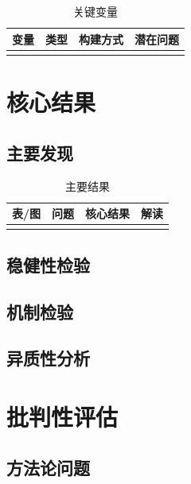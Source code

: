 \documentclass[11pt, a4paper]{article}
\begin{document}
\begin{table}[h]
\centering
\small
\begin{tabularx}{\linewidth}{llXl}
\toprule
变量 & 类型 & 构建方式 & 潜在问题 \\
\midrule
 &  &  &  \\
\bottomrule
\end{tabularx}
\caption{关键变量}
\end{table}

\section{核心结果}

\subsection{主要发现}

\begin{table}[h]
\centering
\small
\begin{tabularx}{\linewidth}{lXll}
\toprule
表/图 & 问题 & 核心结果 & 解读 \\
\midrule
 &  &  &  \\
\bottomrule
\end{tabularx}
\caption{主要结果}
\end{table}

\subsection{稳健性检验}

\subsection{机制检验}

\subsection{异质性分析}

\section{批判性评估}

\subsection{方法论问题}
\end{document}
